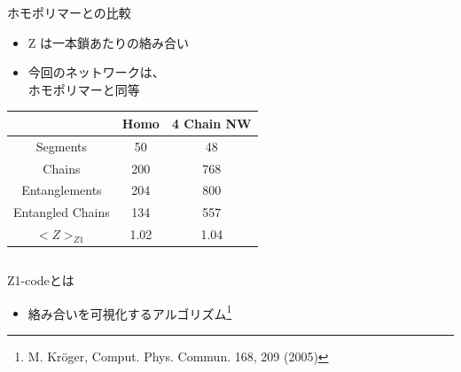 \documentclass[aspectratio=169,11pt, dvipdfmx]{beamer}
\begin{document}
\begin{frame}
\begin{columns}[onlytextwidth]
            \begin{block}{ホモポリマーとの比較}
                \begin{itemize}
                    \item Z は一本鎖あたりの絡み合い
                    \item 今回のネットワークは、\\ホモポリマーと同等
                \end{itemize}
                \scriptsize
                \begin{center}
                    \begin{tabular}{c||c|c} \hline
                        &Homo & 4 Chain NW \\ \hline \hline
                        Segments& 50& 48 \\ \hline
                        Chains & 200& 768 \\ \hline
                        Entanglements& 204& 800\\ \hline
                        Entangled Chains&134&557 \\ \hline
                        \alert{$<Z>_{Z1}$}&\alert{1.02}& \alert{1.04}\\ \hline
                    \end{tabular}
                \end{center}
            \end{block}
        \end{columns}
    \begin{alertblock}{Z1-codeとは}
        \begin{itemize}
            \item 絡み合いを可視化するアルゴリズム\footnote{
                M. Kröger, Comput. Phys. Commun. 168, 209 (2005)
            }
        \end{itemize}
    \end{alertblock}
\end{frame}
\end{document}
